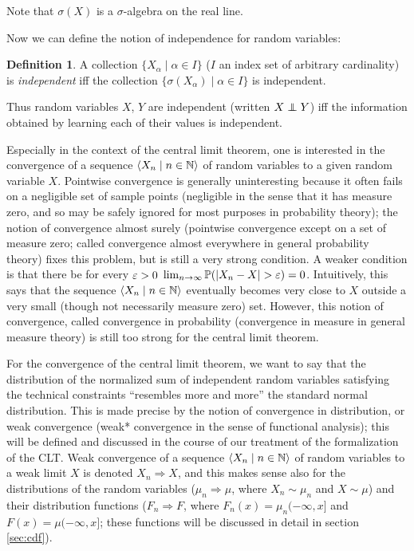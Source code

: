 \documentclass{article}
\theoremstyle{definition}
\newtheorem{definition}[theorem]{Definition}
\newcommand{\bldset}[2]{\{{#1}\mid{#2}\}}
\newcommand{\bldseq}[2]{\langle{#1}\mid{#2}\rangle}
\newcommand\indep{\protect\mathpalette{\protect\independenT}{\perp}}
\def\independenT#1#2{\mathrel{\rlap{$#1#2$}\mkern2mu{#1#2}}}
\begin{document}
Note that $\sigma(X)$ is a $\sigma$-algebra on the real line.

Now we can define the notion of independence for random variables:

\begin{definition}
A collection $\bldset{X_\alpha}{\alpha \in I}$ ($I$ an index set of arbitrary cardinality) is {\em independent} iff the collection $\bldset{\sigma(X_\alpha)}{\alpha \in I}$ is independent.
\end{definition}

Thus random variables $X$, $Y$ are independent (written $X \indep Y$) iff the information obtained by learning each of their values is independent.

Especially in the context of the central limit theorem, one is interested in the convergence of a sequence $\bldseq{X_n}{n \in \N}$ of random variables to a given random variable $X$. Pointwise convergence is generally uninteresting because it often fails on a negligible set of sample points (negligible in the sense that it has measure zero, and so may be safely ignored for most purposes in probability theory); the notion of convergence almost surely (pointwise convergence except on a set of measure zero; called convergence almost everywhere in general probability theory) fixes this problem, but is still a very strong condition. A weaker condition is that there be for every $\varepsilon > 0$ $\lim_{n \rightarrow \infty} \mathbb{P}(|X_n - X| > \varepsilon) = 0$. Intuitively, this says that the sequence $\bldseq{X_n}{n \in \N}$ eventually becomes very close to $X$ outside a very small (though not necessarily measure zero) set. However, this notion of convergence, called convergence in probability (convergence in measure in general measure theory) is still too strong for the central limit theorem.

For the convergence of the central limit theorem, we want to say that the distribution of the normalized sum of independent random variables satisfying the technical constraints ``resembles more and more'' the standard normal distribution. This is made precise by the notion of convergence in distribution, or weak convergence (weak* convergence in the sense of functional analysis); this will be defined and discussed in the course of our treatment of the formalization of the CLT. Weak convergence of a sequence $\bldseq{X_n}{n \in \N}$ of random variables to a weak limit $X$ is denoted $X_n \Rightarrow X$, and this makes sense also for the distributions of the random variables ($\mu_n \Rightarrow \mu$, where $X_n \sim \mu_n$ and $X \sim \mu$) and their distribution functions ($F_n \Rightarrow F$, where $F_n(x) = \mu_n (-\infty, x]$ and $F(x) = \mu (-\infty, x]$; these functions will be discussed in detail in section \ref{sec:cdf}).
\end{document}
